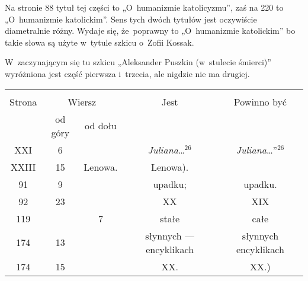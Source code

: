\documentclass[a4paper,11pt]{article}
\begin{document}
\start {} Na stronie 88 tytuł tej części to „O~humanizmie
katolicyzmu”, zaś na 220 to „O~humanizmie katolickim”. Sens tych dwóch
tytułów jest oczywiście diametralnie różny. Wydaje się, że~poprawny to
„O~humanizmie katolickim” bo takie słowa są użyte w~tytule szkicu
o~Zofii Kossak.

\vspace{\spaceFour}



\start {} W~zaczynającym się tu szkicu „Aleksander Puszkin
(w~stulecie śmierci)” wyróżniona jest część pierwsza i~trzecia, ale
nigdzie nie ma drugiej.

\vspace{\spaceFour}







\begin{center}

  \begin{tabular}{|c|c|c|c|c|}
    \hline
    & \multicolumn{2}{c|}{} & & \\
    Strona & \multicolumn{2}{c|}{Wiersz} & Jest
                              & Powinno być \\ \cline{2-3}
    & od góry & od dołu & & \\
    \hline
    XXI   &  6 & & \emph{Juliana}\ldots$^{ 26 }$
           & \emph{Juliana}\ldots”$^{ 26 }$ \\
    XXIII & 15 & Lenowa. & Lenowa). \\
    91  &  9 & & upadku; & upadku. \\
    92  & 23 & & XX & XIX \\
    119 & & 7 & stałe & całe \\
    174 & 13 & & słynnych --- encyklikach & słynnych encyklikach \\
    174 & 15 & & XX. & XX.) \\
    \hline
  \end{tabular}

\end{center}


\vspace{\spaceTwo}
\end{document}
